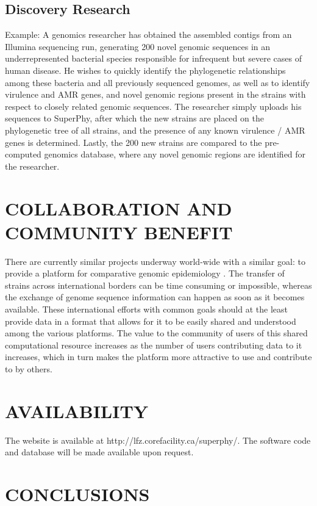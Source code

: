 \documentclass[a4paper,twoside]{article}
\begin{document}
\subsection{Discovery Research}
Example: A genomics researcher has obtained the assembled contigs from an Illumina sequencing run, generating 200 novel genomic sequences in an underrepresented bacterial species responsible for infrequent but severe cases of human disease. He wishes to quickly identify the phylogenetic relationships among these bacteria and all previously sequenced genomes, as well as to identify virulence and AMR genes, and novel genomic regions present in the strains with respect to closely related genomic sequences. The researcher simply uploads his sequences to SuperPhy, after which the new strains are placed on the phylogenetic tree of all strains, and the presence of any known virulence / AMR genes is determined. Lastly, the 200 new strains are compared to the pre-computed genomics database, where any novel genomic regions are identified for the researcher.

\section{\uppercase{Collaboration and Community Benefit}}
\label{sec:collaboration}
There are currently similar projects underway world-wide with a similar goal: to provide a platform for comparative genomic epidemiology \cite{kupferschmidt_outbreak_2011}. The transfer of strains across international borders can be time consuming or impossible, whereas the exchange of genome sequence information can happen as soon as it becomes available. These international efforts with common goals should at the least provide data in a format that allows for it to be easily shared and understood among the various platforms. The value to the community of users of this shared computational resource increases as the number of users contributing data to it increases, which in turn makes the platform more attractive to use and contribute to by others.

\section{\uppercase{Availability}}
\label{sec:availability}

The website is available at http://lfz.corefacility.ca/superphy/. The software code and database will be made available upon request.

\section{\uppercase{Conclusions}}
\label{sec:conclusion}
\end{document}
